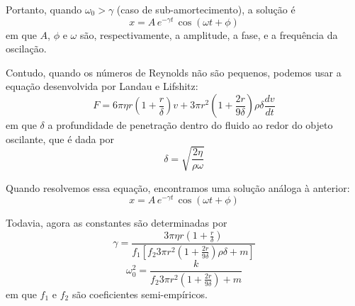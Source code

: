 \documentclass[a4paper, 12pt]{article}
\begin{document}
\begin{multicols}{2}
\begin{enumerate}
				\par Portanto, quando $\omega_0 > \gamma$ (caso de sub-amortecimento), a solução é
					$$x = A \, e^{- \gamma t} \, \cos (\omega t + \phi)$$
				em que $A$, $\phi$ e $\omega$ são, respectivamente, a amplitude, a fase, e a frequência da oscilação.
				\par Contudo, quando os números de Reynolds não são pequenos, podemos usar a equação desenvolvida por Landau e Lifshitz:
				$$F = 6 \pi \eta r \left(1 + \frac{r}{\delta} \right) v + 3 \pi r^2 \left( 1 + \frac{2 r}{9 \delta} \right) \rho \delta \dfrac{d v}{d t}$$
				em que $\delta$ a profundidade de penetração dentro do fluido ao redor do objeto oscilante, que é dada por
				$$\delta = \sqrt{\frac{2 \eta}{\rho \omega}}$$
				\par Quando resolvemos essa equação, encontramos uma solução análoga à anterior:
					$$x = A \, e^{- \gamma t} \, \cos (\omega t + \phi)$$
				\par Todavia, agora as constantes são determinadas por
					$$\gamma = \frac{3 \pi \eta r \left(1+ \frac{r}{\delta} \right)}{f_1 \left[ f_2 3 \pi r^2 \left(1+\frac{2 r}{9 \delta} \right) \rho \delta + m \right]}$$
					$$\omega_0^2 = \frac{k}{f_2 3 \pi r^2 \left(1 + \frac{2 r}{9 \delta} \right) + m}$$
				em que $f_1$ e $f_2$ são coeficientes semi-empíricos.
				

\end{enumerate}
\end{multicols}
\end{document}
